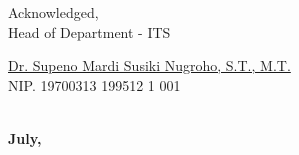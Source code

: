 
\begin{center}
  Acknowledged, \\
  Head of \engdepartment{} Department \engfacultyshort{} - ITS \\

  \vspace{15ex}

  \underline{Dr. Supeno Mardi Susiki Nugroho, S.T., M.T.} \\
  NIP. 19700313 199512 1 001
\end{center}

\begin{center}
  \textbf{\MakeUppercase{\place{}}\\July, \the\year{}}
\end{center}
\endgroup
